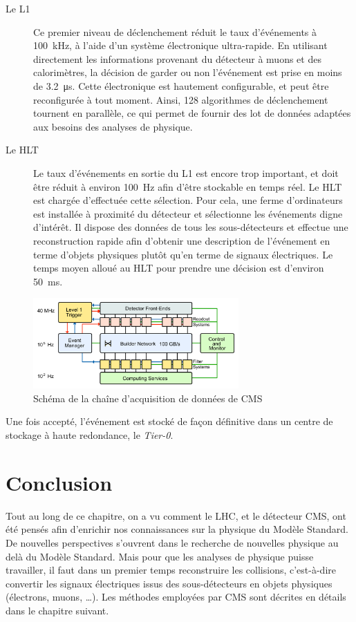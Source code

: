 \begin{description}
  \item[Le L1] Ce premier niveau de déclenchement réduit le taux d’événements à \SI{100}{\kHz}, à l'aide d'un système électronique ultra-rapide. En utilisant directement les informations provenant du détecteur à muons et des calorimètres, la décision de garder ou non l'événement est prise en moins de \SI{3.2}{\us}. Cette électronique est hautement configurable, et peut être reconfigurée à tout moment. Ainsi, 128 algorithmes de déclenchement tournent en parallèle, ce qui permet de fournir des lot de données adaptées aux besoins des analyses de physique.
  \item[Le HLT] Le taux d'événements en sortie du L1 est encore trop important, et doit être réduit à environ \SI{100}{\Hz} afin d'être stockable en temps réel. Le HLT est chargée d'effectuée cette sélection. Pour cela, une ferme d'ordinateurs est installée à proximité du détecteur et sélectionne les événements digne d’intérêt. Il dispose des données de tous les sous-détecteurs et effectue une reconstruction rapide afin d'obtenir une description de l'événement en terme d'objets physiques plutôt qu'en terme de signaux électriques. Le temps moyen alloué au HLT pour prendre une décision est d'environ \SI{50}{\ms}.
\end{description}

\begin{figure}[tb] \centering
  \includegraphics[width=0.7\textwidth]{chapitre2/figs/DAQ.pdf}
  \caption{Schéma de la chaîne d'acquisition de données de CMS}
  \label{fig:daq}
\end{figure}

Une fois accepté, l'événement est stocké de façon définitive dans un centre de stockage à haute redondance, le \emph{Tier-0}.

\section{Conclusion}

Tout au long de ce chapitre, on a vu comment le LHC, et le détecteur CMS, ont été pensés afin d'enrichir nos connaissances sur la physique du Modèle Standard. De nouvelles perspectives s'ouvrent dans le recherche de nouvelles physique au delà du Modèle Standard. Mais pour que les analyses de physique puisse travailler, il faut dans un premier temps reconstruire les collisions, c'est-à-dire convertir les signaux électriques issus des sous-détecteurs en objets physiques (électrons, muons, \dots). Les méthodes employées par CMS sont décrites en détails dans le chapitre suivant.